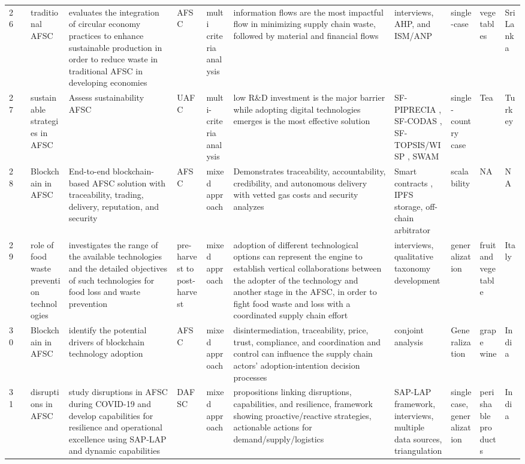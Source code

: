 \documentclass[a4paper,10pt]{article}
\begin{document}
\begin{landscape}
\begin{small}
\begin{longtable}{p{0.5cm} p{2cm} p{2.5cm} p{4cm} p{1cm} p{2.5cm} p{5.5cm} p{2.5cm} p{2.5cm} p{1.8cm} p{1.5cm}}
26 & \textcite{Madushan17} &  traditional AFSC &  evaluates the integration of circular economy practices to enhance sustainable production in order to reduce waste in traditional AFSC in developing economies&AFSC & multi criteria analysis& information flows are the most impactful flow in minimizing supply chain waste, followed by material and financial flows&interviews, AHP, and ISM/ANP   & single-case & vegetables & Sri Lanka \\
27 & \textcite{Betul12} &  sustainable strategies in AFSC & Assess sustainability AFSC&UAFC & multi-criteria analysis&low R\&D investment is the major barrier while adopting digital technologies emerges is  the most effective solution &SF-PIPRECIA , SF-CODAS , SF-TOPSIS/WISP , SWAM    & single-country case& Tea& Turkey  \\
28 & \textcite{AFFAF1} &  Blockchain in AFSC &  End-to-end blockchain-based AFSC solution with traceability, trading, delivery, reputation, and security&AFSC & mixed approach& Demonstrates traceability, accountability, credibility, and autonomous delivery with vetted gas costs and security analyzes &Smart contracts , IPFS storage, off-chain arbitrator   & scalability& NA& NA \\
29 & \textcite{Federica4} &  role of food waste prevention technologies & investigates the range of the available technologies and the detailed objectives of such technologies for food loss and waste prevention &pre-harvest to post-harvest  & mixed approach&  adoption of different technological options can represent the engine to establish vertical collaborations between the adopter of the technology and another stage in the AFSC, in order to fight food waste and loss with a coordinated supply chain effort &interviews, qualitative taxonomy development & generalization& fruit and vegetable& Italy  \\
30 & \textcite{Samant7} &  Blockchain in AFSC& identify the potential drivers of blockchain technology adoption&AFSC & mixed approach& disintermediation, traceability, price, trust, compliance, and coordination and control can influence the supply chain actors’ adoption-intention decision processes &conjoint analysis   & Generalization& grape wine& India  \\
31 & \textcite{Mishra2} &   disruptions in AFSC & study disruptions in AFSC during COVID-19 and develop capabilities for resilience and operational excellence using SAP-LAP and dynamic capabilities &DAFSC & mixed approach& propositions linking disruptions, capabilities, and resilience, framework showing proactive/reactive strategies, actionable actions for demand/supply/logistics &SAP-LAP framework, interviews, multiple data sources, triangulation & single case,  generalization& perishable products& India   \\

\end{longtable}
\end{small}
\end{landscape}
\end{document}
